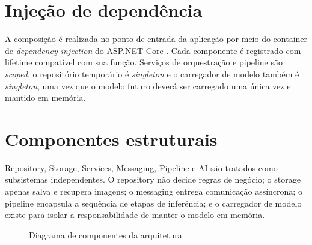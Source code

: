 \section{Injeção de dependência}

A composição é realizada no ponto de entrada da aplicação por meio do container de \textit{dependency injection} do ASP.NET Core \cite{aspnetdocs}. Cada componente é registrado com lifetime compatível com sua função. Serviços de orquestração e pipeline são \textit{scoped}, o repositório temporário é \textit{singleton} e o carregador de modelo também é \textit{singleton}, uma vez que o modelo futuro deverá ser carregado uma única vez e mantido em memória.

\section{Componentes estruturais}

Repository, Storage, Services, Messaging, Pipeline e AI são tratados como subsistemas independentes. O repository não decide regras de negócio; o storage apenas salva e recupera imagens; o messaging entrega comunicação assíncrona; o pipeline encapsula a sequência de etapas de inferência; e o carregador de modelo existe para isolar a responsabilidade de manter o modelo em memória.

\begin{figure}[H]
    \centering
    \caption{Diagrama de componentes da arquitetura}
    \label{fig:componentes-arquitetura}
\end{figure}
